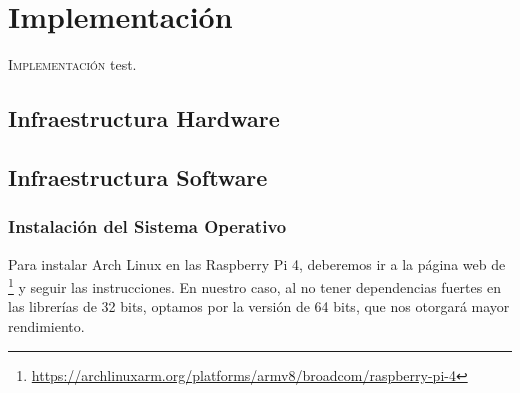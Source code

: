 \chapter{Implementación}
\label{chap:implementacion}

\lettrine{I}{mplementación} test.

\section{Infraestructura Hardware}
\label{sec:impl_infra_hardware}

\section{Infraestructura Software}
\label{sec:impl_infra_software}

\subsection{Instalación del Sistema Operativo}
\label{ssec:instalacion_sistema_operativo}
Para instalar Arch Linux en las Raspberry Pi 4, deberemos ir a la página web de \footnote{\url{https://archlinuxarm.org/platforms/armv8/broadcom/raspberry-pi-4}} y seguir las instrucciones. En nuestro caso, al no tener dependencias fuertes en las librerías de 32 bits, optamos por la versión de 64 bits, que nos otorgará mayor rendimiento.